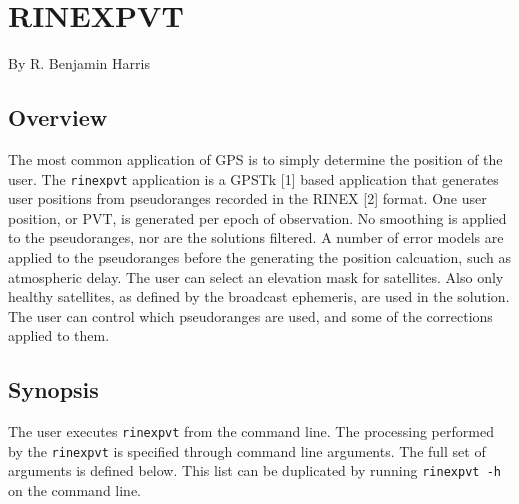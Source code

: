 \chapter{RINEXPVT}

By R. Benjamin Harris

\section{Overview}

The most common application of GPS is to simply determine the position of the
user. The \texttt{rinexpvt} application is a GPSTk [1] based application that
generates user positions from pseudoranges recorded in the RINEX [2] format.
One user position, or PVT, is generated per epoch of observation. No smoothing
is applied to the pseudoranges, nor are the solutions filtered. A number of
error models are applied to the pseudoranges before the generating the
position calcuation, such as atmospheric delay. The user can select an
elevation mask for satellites. Also only healthy satellites, as defined by the
broadcast ephemeris, are used in the solution. The user can control which pseudoranges
are used, and some of the corrections applied to them.

\section{Synopsis}

The user executes \texttt{rinexpvt} from the command line. The processing
performed by the \texttt{rinexpvt} is specified through command line
arguments. The full set of arguments is defined below. This list can be
duplicated by running \texttt{rinexpvt -h} on the command line.

